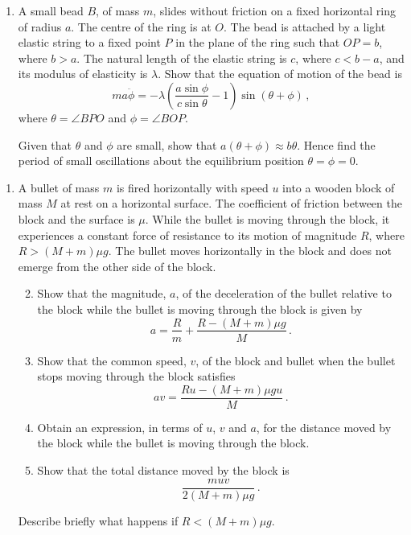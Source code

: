 \documentclass[a4, 11pt]{report}
\newlength{\qspace}
\newcounter{qnumber}
\newenvironment{question}%
 {\vspace{\qspace}
  \begin{enumerate}[\bfseries 1\quad][10]%
    \setcounter{enumi}{\value{qnumber}}%
    \item%
 }
{
  \end{enumerate}
  \filbreak
  \stepcounter{qnumber}
 }
\newenvironment{questionparts}[1][1]%
 {
  \begin{enumerate}[\bfseries (i)]%
    \setcounter{enumii}{#1}
    \addtocounter{enumii}{-1}
    \setlength{\itemsep}{5mm}
    \setlength{\parskip}{8pt}
 }
 {
  \end{enumerate}
 }
\begin{document}
\begin{question}	
A small bead $B$, of mass $m$,
 slides without friction on a fixed horizontal ring of
radius $a$. The centre of the ring is at $O$. The bead is attached by a light
elastic string to a fixed
point $P$ in the plane of the ring such that  $OP = b$, where $b > a$.
The natural length of the elastic string is $c$, where $c < b - a$, and its
modulus of elasticity is $\lambda$. 
Show that the equation of motion of the bead is
\[
ma\ddot \phi = 
-\lambda\left( \frac{a\sin\phi}{c\sin\theta}-1\right)\sin(\theta+\phi)
\,,
\]
where
$\theta=\angle BPO$ and $\phi=\angle BOP$. 


Given that $\theta$ and $\phi$ are small, show that
 $a(\theta+\phi)\approx
b\theta$. Hence find the period of  
small oscillations about the
equilibrium position $\theta=\phi =0$. 
\end{question}


\begin{question}
A bullet of mass $m$ is fired horizontally with speed $u$ into a 
wooden block of
mass $M$ at rest on a horizontal surface. The coefficient of friction
between the block and the surface is $\mu$. While
the bullet is moving through the block, it 
experiences a constant force of resistance to its motion
of magnitude $R$, where $R>(M+m)\mu g$.
The bullet moves horizontally in the block and does not emerge from the
other side of the block.
 
\begin{questionparts}
\item
Show that 
the magnitude, $a$, of the deceleration
of the bullet relative to the block
while the bullet is moving through the block is given by
\[
a= 
\frac R m + \frac {R-(M+m)\mu g}{M}\,
.
\]

\item Show that the common speed, $v$,  of the block and bullet when the 
bullet stops moving through the block satisfies
\[
av = \frac{Ru-(M+m)\mu gu}M\,.
\]

\item Obtain an expression, in terms of $u$, $v$ and $a$, for the 
distance moved by the block while the bullet is moving through the block.

\item Show that the total distance moved by the block is 
\[
\frac{muv}{2(M+m)\mu g}\,.
\]
\end{questionparts}

Describe briefly what happens if $R< (M+m)\mu g$.
\end{question}
	
\end{document}
